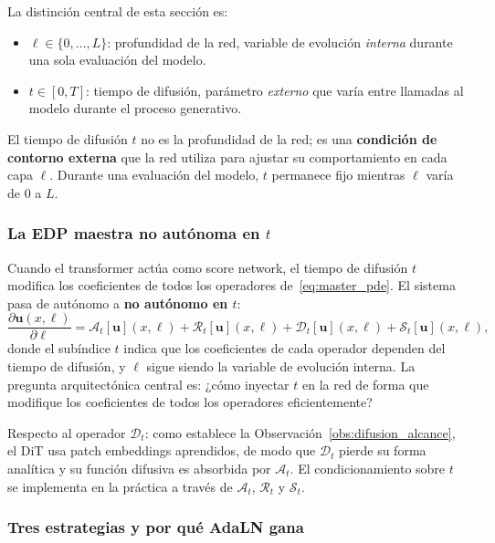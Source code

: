 La distinción central de esta sección es:
\begin{itemize}
  \item $\ell \in \{0,\ldots,L\}$: profundidad de la red,
        variable de evolución \emph{interna} durante una sola
        evaluación del modelo.
  \item $t \in [0,T]$: tiempo de difusión, parámetro
        \emph{externo} que varía entre llamadas al modelo durante
        el proceso generativo.
\end{itemize}
El tiempo de difusión $t$ no es la profundidad de la red; es una
\textbf{condición de contorno externa} que la red utiliza para
ajustar su comportamiento en cada capa $\ell$. Durante una
evaluación del modelo, $t$ permanece fijo mientras $\ell$ varía
de $0$ a $L$.

\subsubsection*{La EDP maestra no autónoma en $t$}

Cuando el transformer actúa como score network, el tiempo de
difusión $t$ modifica los coeficientes de todos los operadores
de~\eqref{eq:master_pde}. El sistema pasa de autónomo a
\textbf{no autónomo en $t$}:
\begin{equation}
  \frac{\partial \bm{u}(x,\ell)}{\partial \ell}
  = \mathcal{A}_t[\bm{u}](x,\ell)
  + \mathcal{R}_t[\bm{u}](x,\ell)
  + \mathcal{D}_t[\bm{u}](x,\ell)
  + \mathcal{S}_t[\bm{u}](x,\ell),
  \label{eq:master_pde_t}
\end{equation}
donde el subíndice $t$ indica que los coeficientes de cada
operador dependen del tiempo de difusión, y $\ell$ sigue siendo
la variable de evolución interna. La pregunta arquitectónica
central es: ¿cómo inyectar $t$ en la red de forma que modifique
los coeficientes de todos los operadores eficientemente?

Respecto al operador $\mathcal{D}_t$: como establece la
Observación~\ref{obs:difusion_alcance}, el DiT usa patch embeddings
aprendidos, de modo que $\mathcal{D}_t$ pierde su forma analítica
y su función difusiva es absorbida por $\mathcal{A}_t$. El
condicionamiento sobre $t$ se implementa en la práctica a través
de $\mathcal{A}_t$, $\mathcal{R}_t$ y $\mathcal{S}_t$.

\subsubsection*{Tres estrategias y por qué AdaLN gana}

